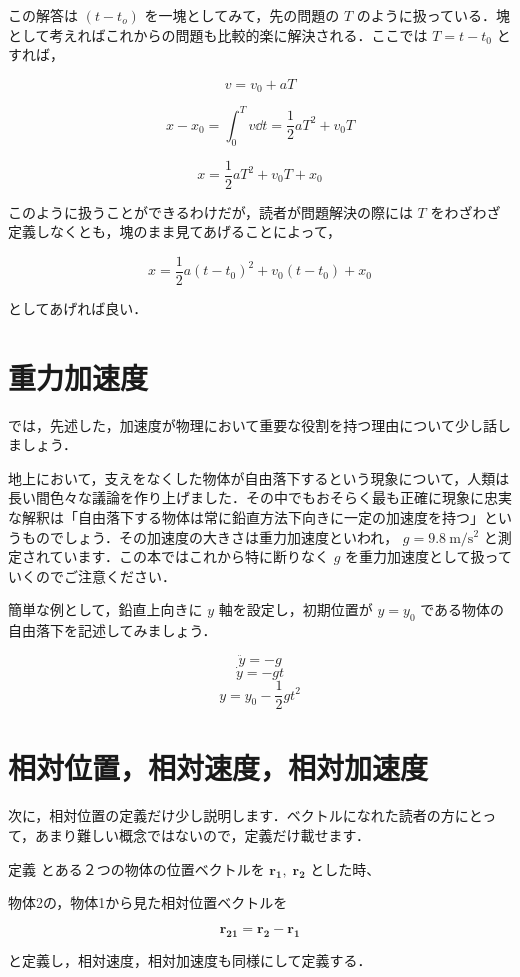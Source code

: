 \documentclass[
  b4paperpaper,
  xelatex,ja=standard]{bxjsbook}
\begin{document}
この解答は \((t-t_o)\) を一塊としてみて，先の問題の \(T\)
のように扱っている．塊として考えればこれからの問題も比較的楽に解決される．ここでは
\(T=t-t_0\) とすれば，

\[v=v_0 + aT\]

\[x-x_0=\int_{0}^{T}v\dd t =\frac{1}{2}aT^2+v_0T\]

\[x = \frac{1}{2}aT^2+v_0T + x_0\]

このように扱うことができるわけだが，読者が問題解決の際には \(T\)
をわざわざ定義しなくとも，塊のまま見てあげることによって，

\[x = \frac{1}{2}a(t-t_0)^2+v_0(t-t_0) + x_0\]

としてあげれば良い．

\hypertarget{ux91cdux529bux52a0ux901fux5ea6}{%
\section{重力加速度}\label{ux91cdux529bux52a0ux901fux5ea6}}

では，先述した，加速度が物理において重要な役割を持つ理由について少し話しましょう．

地上において，支えをなくした物体が自由落下するという現象について，人類は長い間色々な議論を作り上げました．その中でもおそらく最も正確に現象に忠実な解釈は「自由落下する物体は常に鉛直方法下向きに一定の加速度を持つ」というものでしょう．その加速度の大きさは重力加速度といわれ，
\(g=9.8\:\text{m}/\text{s}^2\)
と測定されています．この本ではこれから特に断りなく \(g\)
を重力加速度として扱っていくのでご注意ください．

簡単な例として，鉛直上向きに \(y\) 軸を設定し，初期位置が \(y=y_0\)
である物体の自由落下を記述してみましょう．

\[\ddot{y}=-g\] \[\dot{y}=-gt\] \[y=y_0-\frac{1}{2}gt^2\]

\hypertarget{ux76f8ux5bfeux4f4dux7f6eux76f8ux5bfeux901fux5ea6ux76f8ux5bfeux52a0ux901fux5ea6}{%
\section{相対位置，相対速度，相対加速度}\label{ux76f8ux5bfeux4f4dux7f6eux76f8ux5bfeux901fux5ea6ux76f8ux5bfeux52a0ux901fux5ea6}}

次に，相対位置の定義だけ少し説明します．ベクトルになれた読者の方にとって，あまり難しい概念ではないので，定義だけ載せます．

\begin{Dbox}{定義}
とある２つの物体の位置ベクトルを \(\boldsymbol{r_1},\;\boldsymbol{r_2}\)
とした時、

物体2の，物体1から見た相対位置ベクトルを

\[\boldsymbol{r_{21}}=\boldsymbol{r_2}-\boldsymbol{r_1}\]

と定義し，相対速度，相対加速度も同様にして定義する．

\end{Dbox}
\end{document}
